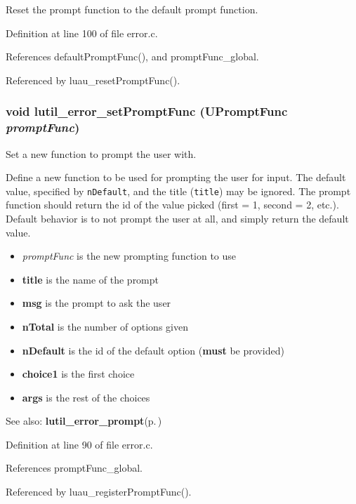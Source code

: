 Reset the prompt function to the default prompt function. 



Definition at line 100 of file error.c.

References default\-Prompt\-Func(), and prompt\-Func\_\-global.

Referenced by luau\_\-reset\-Prompt\-Func().
\subsubsection{\setlength{\rightskip}{0pt plus 5cm}void lutil\_\-error\_\-set\-Prompt\-Func ({\bf UPrompt\-Func} {\em prompt\-Func})}\label{error_8c_a3}


Set a new function to prompt the user with. 

Define a new function to be used for prompting the user for input. The default value, specified by {\tt n\-Default}, and the title ({\tt title}) may be ignored. The prompt function should return the id of the value picked (first = 1, second = 2, etc.). Default behavior is to not prompt the user at all, and simply return the default value.

\begin{itemize}
\item {\em prompt\-Func\/} is the new prompting function to use \item {\bf title} is the name of the prompt \item {\bf msg} is the prompt to ask the user \item {\bf n\-Total} is the number of options given \item {\bf n\-Default} is the id of the default option ({\bf must} be provided) \item {\bf choice1} is the first choice \item {\bf args} is the rest of the choices\end{itemize}
\begin{Desc}
\item[See also:]{\bf lutil\_\-error\_\-prompt}{\rm (p.\,\pageref{error_8h_a8})} \end{Desc}


Definition at line 90 of file error.c.

References prompt\-Func\_\-global.

Referenced by luau\_\-register\-Prompt\-Func().

